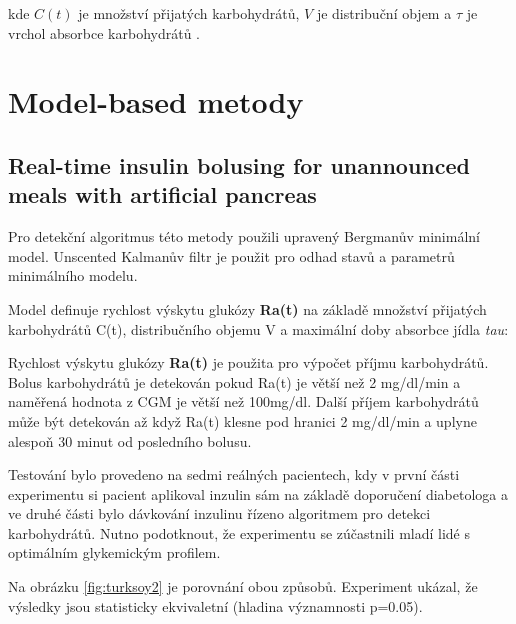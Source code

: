 
\noindent kde $C(t)$ je množství přijatých karbohydrátů, $V$  je distribuční objem a $\tau$ je vrchol absorbce karbohydrátů \citep{analyzaCHO.Turksoy}.


\section{Model-based metody}
\subsection{Real-time insulin bolusing for unannounced meals with artificial pancreas}
\label{ch:analyzaCHO:turksoy}

Pro detekční algoritmus této metody použili \citet{analyzaCHO.Turksoy} upravený Bergmanův minimální model. Unscented Kalmanův filtr je použit pro odhad stavů a parametrů minimálního modelu.

Model definuje rychlost výskytu glukózy \textbf{Ra(t)} na základě množství přijatých karbohydrátů C(t), distribučního objemu V a maximální doby absorbce jídla \textit{tau}:


Rychlost výskytu glukózy \textbf{Ra(t)} je použita pro výpočet příjmu karbohydrátů. Bolus karbohydrátů je detekován pokud Ra(t) je větší než 2 mg/dl/min a naměřená hodnota z CGM je větší než 100mg/dl. Další příjem karbohydrátů může být detekován až když Ra(t) klesne pod hranici 2 mg/dl/min a uplyne alespoň 30 minut od posledního bolusu.

Testování bylo provedeno na sedmi reálných pacientech, kdy v první části experimentu si pacient aplikoval inzulin sám na základě doporučení diabetologa a ve druhé části bylo dávkování inzulinu řízeno algoritmem pro detekci karbohydrátů. Nutno podotknout, že experimentu se zúčastnili mladí lidé s optimálním glykemickým profilem.

Na obrázku \ref{fig:turksoy2} je porovnání obou způsobů. Experiment ukázal, že výsledky jsou statisticky ekvivaletní (hladina významnosti p=0.05).

